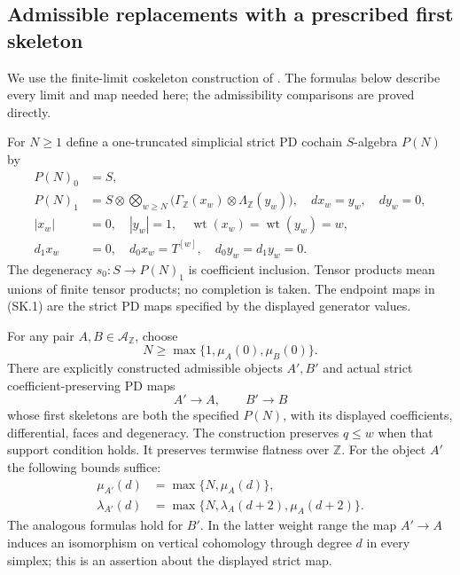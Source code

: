 \subsection{Admissible replacements with a prescribed first skeleton}

We use the finite-limit coskeleton construction of
\cite[Section 14.19, Lemmas 14.19.2 and 14.19.4]{Root_Coskeleton}.
The formulas below describe every limit and map needed here;
the admissibility comparisons are proved directly.

For $N\geq1$ define a one-truncated simplicial strict PD cochain
$S$-algebra $P(N)$ by
\[
 \begin{split}
 P(N)_0&=S,\\
 P(N)_1&=S\otimes
       \bigotimes_{w\geq N}\bigl(\Gamma_{\mathbb Z}(x_w)
                                      \otimes\Lambda_{\mathbb Z}(y_w)\bigr),
 \quad dx_w=y_w,\quad dy_w=0,\\
 |x_w|&=0,\quad |y_w|=1,\quad
 \operatorname{wt}(x_w)=\operatorname{wt}(y_w)=w,\\
 d_1x_w&=0,\quad d_0x_w=T^{[w]},\quad d_0y_w=d_1y_w=0.
 \end{split}                                                     \tag{SK.1}
\]
The degeneracy $s_0:S\to P(N)_1$ is coefficient inclusion.
Tensor products mean unions of finite tensor products; no completion
is taken. The endpoint maps in (SK.1) are the strict PD maps
specified by the displayed generator values.

\begin{theorem}
\label{A004}
For any pair $A,B\in\mathcal A_{\mathbb Z}$, choose
\[
                 N\geq\max\{1,\mu_A(0),\mu_B(0)\}.
 \tag{SK.2}
\]
There are explicitly constructed admissible objects $A',B'$ and
actual strict coefficient-preserving PD maps
\[
                        A'\longrightarrow A,
                 \qquad B'\longrightarrow B                     \tag{SK.3}
\]
whose first skeletons are both the specified $P(N)$, with its
displayed coefficients, differential, faces and degeneracy.
The construction preserves $q\leq w$ when that support condition
holds. It preserves termwise flatness over $\mathbb Z$.
For the object $A'$ the following bounds suffice:
\[
 \begin{split}
 \mu_{A'}(d)&=\max\{N,\mu_A(d)\},\\
 \lambda_{A'}(d)&=
       \max\{N,\lambda_A(d+2),\mu_A(d+2)\}.
 \end{split}                                                     \tag{SK.4}
\]
The analogous formulas hold for $B'$.
In the latter weight range the map $A'\to A$ induces an
isomorphism on vertical cohomology through degree $d$ in every
simplex; this is an assertion about the displayed strict map.
\end{theorem}

